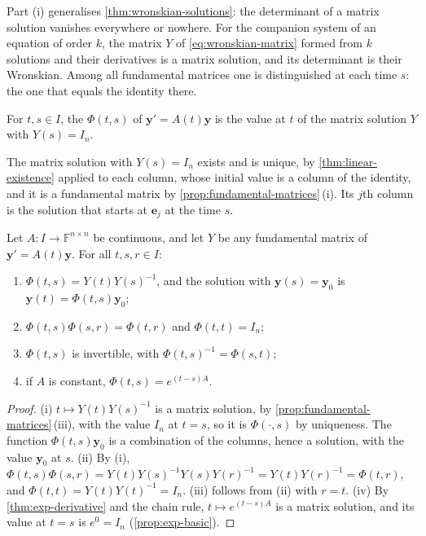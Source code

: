 Part (i) generalises \cref{thm:wronskian-solutions}: the determinant of a matrix solution vanishes everywhere or nowhere. For the companion system of an equation of order $k$, the matrix $Y$ of \eqref{eq:wronskian-matrix} formed from $k$ solutions and their derivatives is a matrix solution, and its determinant is their Wronskian. Among all fundamental matrices one is distinguished at each time $s$: the one that equals the identity there.

\begin{definition}
\label{def:transition-matrix}
For $t,s\in I$, the  $\Phi(t,s)$ of $\mathbf y'=A(t)\mathbf y$ is the value at $t$ of the matrix solution $Y$ with $Y(s)=I_n$.
\end{definition}

The matrix solution with $Y(s)=I_n$ exists and is unique, by \cref{thm:linear-existence} applied to each column, whose initial value is a column of the identity, and it is a fundamental matrix by \cref{prop:fundamental-matrices}\,(i). Its $j$th column is the solution that starts at $\mathbf e_j$ at the time $s$.

\begin{proposition}
\label{prop:transition-matrix}
Let $A\colon I\to\mathbb F^{n\times n}$ be continuous, and let $Y$ be any fundamental matrix of $\mathbf y'=A(t)\mathbf y$. For all $t,s,r\in I$:
\begin{enumerate}
\item $\Phi(t,s)=Y(t)Y(s)^{-1}$, and the solution with $\mathbf y(s)=\mathbf y_0$ is $\mathbf y(t)=\Phi(t,s)\mathbf y_0$;
\item $\Phi(t,s)\Phi(s,r)=\Phi(t,r)$ and $\Phi(t,t)=I_n$;
\item $\Phi(t,s)$ is invertible, with $\Phi(t,s)^{-1}=\Phi(s,t)$;
\item if $A$ is constant, $\Phi(t,s)=e^{(t-s)A}$.
\end{enumerate}
\end{proposition}

\begin{proof}
(i) $t\mapsto Y(t)Y(s)^{-1}$ is a matrix solution, by \cref{prop:fundamental-matrices}\,(iii), with the value $I_n$ at $t=s$, so it is $\Phi(\cdot,s)$ by uniqueness. The function $\Phi(t,s)\mathbf y_0$ is a combination of the columns, hence a solution, with the value $\mathbf y_0$ at $s$. (ii) By (i), $\Phi(t,s)\Phi(s,r)=Y(t)Y(s)^{-1}Y(s)Y(r)^{-1}=Y(t)Y(r)^{-1}=\Phi(t,r)$, and $\Phi(t,t)=Y(t)Y(t)^{-1}=I_n$. (iii) follows from (ii) with $r=t$. (iv) By \cref{thm:exp-derivative} and the chain rule, $t\mapsto e^{(t-s)A}$ is a matrix solution, and its value at $t=s$ is $e^0=I_n$ (\cref{prop:exp-basic}).
\end{proof}

